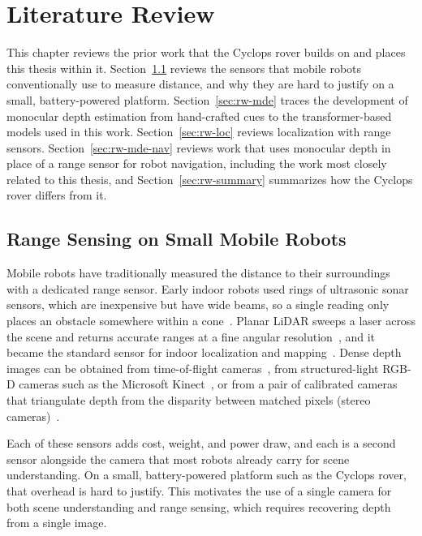 \chapter{Literature Review}
\label{ch:lit-review}

This chapter reviews the prior work that the Cyclops rover builds on and places this thesis
within it. Section~\ref{sec:rw-range} reviews the sensors that mobile robots conventionally use to
measure distance, and why they are hard to justify on a small, battery-powered platform.
Section~\ref{sec:rw-mde} traces the development of monocular depth estimation from hand-crafted
cues to the transformer-based models used in this work. Section~\ref{sec:rw-loc} reviews
localization with range sensors. Section~\ref{sec:rw-mde-nav} reviews work that uses monocular
depth in place of a range sensor for robot navigation, including the work most closely related to
this thesis, and Section~\ref{sec:rw-summary} summarizes how the Cyclops rover differs from it.

\section{Range Sensing on Small Mobile Robots}
\label{sec:rw-range}

Mobile robots have traditionally measured the distance to their surroundings with a dedicated
range sensor. Early indoor robots used rings of ultrasonic sonar sensors, which are inexpensive but
have wide beams, so a single reading only places an obstacle somewhere within a
cone~\cite{Moravec_Sonar}. Planar LiDAR sweeps a laser across the scene and returns accurate ranges
at a fine angular resolution~\cite{kawata2005urg}, and it became the standard sensor for indoor
localization and mapping~\cite{thrun2005probabilistic, hess2016cartographer}. 
Dense depth images can be obtained from time-of-flight cameras~\cite{ToF}, from structured-light
RGB-D cameras such as the Microsoft Kinect~\cite{rgbd}, or from a pair of calibrated cameras that
triangulate depth from the disparity between matched pixels (stereo cameras)~\cite{stereo}.

Each of these sensors adds cost, weight, and power draw, and each is a second sensor alongside the
camera that most robots already carry for scene understanding. On a small, battery-powered
platform such as the Cyclops rover, that overhead is hard to justify. This motivates the use of a
single camera for both scene understanding and range sensing, which requires recovering depth from
a single image.


